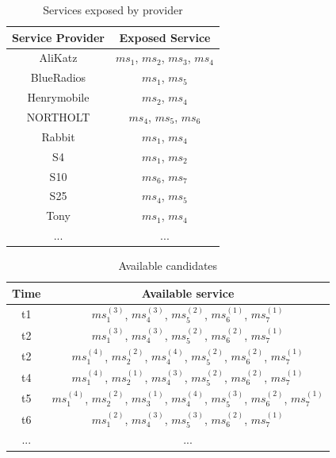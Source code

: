 \documentclass[10pt,journal,compsoc]{IEEEtran}
\begin{document}
\begin{table}[!t]
\renewcommand{\arraystretch}{1.3}
\caption{Services exposed by provider}
\label{Services exposed by provider}
\centering
\begin{tabular}{c c}
\hline
\bfseries Service Provider & \bfseries Exposed Service\\
\hline
AliKatz     & $ms_1$, $ms_2$, $ms_3$, $ms_4$\\
BlueRadios  & $ms_1$, $ms_5$\\
Henrymobile & $ms_2$, $ms_4$\\
NORTHOLT    & $ms_4$, $ms_5$, $ms_6$ \\
Rabbit      & $ms_1$, $ms_4$\\
S4          & $ms_1$, $ms_2$\\
S10         & $ms_6$, $ms_7$\\
S25         & $ms_4$, $ms_5$\\
Tony        & $ms_1$, $ms_4$\\
... & ...\\
\hline
\end{tabular}
\end{table}

\begin{table}[!t]
\renewcommand{\arraystretch}{1.8}
\caption{Available candidates}
\label{Available candidates}
\centering
\begin{tabular}{c c}
\hline
\bfseries Time & \bfseries Available service\\
\hline
t1     & $ms_1^{(3)}$, $ms_4^{(3)}$, $ms_5^{(2)}$, $ms_6^{(1)}$, $ms_7^{(1)}$ \\
t2     & $ms_1^{(3)}$, $ms_4^{(3)}$, $ms_5^{(2)}$, $ms_6^{(2)}$, $ms_7^{(1)}$ \\
t2     & $ms_1^{(4)}$, $ms_2^{(2)}$, $ms_4^{(4)}$, $ms_5^{(2)}$, $ms_6^{(2)}$, $ms_7^{(1)}$ \\
t4     & $ms_1^{(4)}$, $ms_2^{(1)}$, $ms_4^{(3)}$, $ms_5^{(2)}$, $ms_6^{(2)}$, $ms_7^{(1)}$ \\
t5     & $ms_1^{(4)}$, $ms_2^{(2)}$, $ms_3^{(1)}$, $ms_4^{(4)}$, $ms_5^{(3)}$, $ms_6^{(2)}$, $ms_7^{(1)}$ \\
t6     & $ms_1^{(2)}$, $ms_4^{(3)}$, $ms_5^{(3)}$, $ms_6^{(2)}$, $ms_7^{(1)}$ \\
... & ...\\
\hline
\end{tabular}
\end{table}
\end{document}

